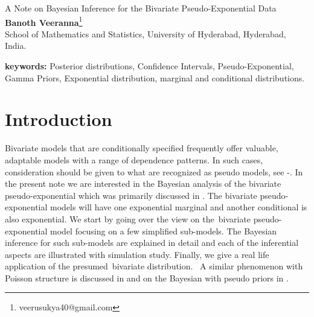 \documentclass[12pt]{article}    %
\numberwithin{equation}{section}
\begin{document}
	
	\begin{center} { \large \sc  A Note on Bayesian Inference for the Bivariate Pseudo-Exponential Data}\\
		\vskip 0.1in {\bf Banoth Veeranna}\footnote{veerusukya40@gmail.com}
		\\
		\vskip 0.1in 
		School of Mathematics and Statistics, University of Hyderabad, Hyderabad, India. \\
		
		
		
		
		
		
	\end{center}
	
	\begin{abstract} 
		 In this present work, we discuss the Bayesian inference for the bivariate pseudo-exponential distribution. Initially, we assume independent gamma priors and then pseudo-gamma priors for the pseudo-exponential parameters. We are primarily interested in deriving the posterior means for each of priors assumed and also comparing each of the posterior means with the maximum likelihood estimators. Finally, all the Bayesian analyses are illustrated with a simulation study and also illustrated with real-life applications.
	\end{abstract}
	
	\textbf{keywords:} Posterior distributions, Confidence Intervals, Pseudo-Exponential, Gamma Priors, Exponential distribution, marginal and conditional distributions.
	
	\bigskip
	
	
	\section{Introduction }  Bivariate models that are conditionally specified frequently offer valuable, adaptable models with a range of dependence patterns. In such cases, consideration should be given to what are recognized as pseudo models, see \cite{FF2006}-\cite{FF2013}. In the present note we are interested in the Bayesian analysis of the bivariate pseudo-exponential which was primarily discussed in \cite{BM2019}.  The bivariate pseudo-exponential models will have one exponential marginal and another conditional is also exponential. We start by going over the view on the bivariate pseudo-exponential model focusing on a few simplified sub-models. The Bayesian inference for such sub-models are explained in detail and each of the inferential aspects are illustrated with simulation study. Finally, we give a real life application of the presumed bivariate distribution.  A similar phenomenon with Poisson structure is discussed in \cite{am21} and on the Bayesian with pseudo priors in \cite{BM2019}.
	
\end{document}
